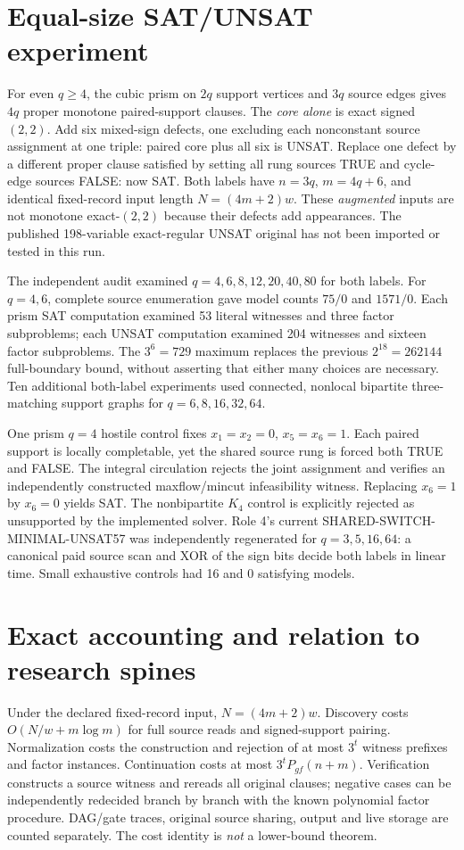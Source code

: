 \documentclass[10pt]{article}
\begin{document}
\section{Equal-size SAT/UNSAT experiment}
For even $q\ge4$, the cubic prism on $2q$ support vertices and $3q$ source edges gives $4q$ proper monotone paired-support clauses. The \emph{core alone} is exact signed $(2,2)$. Add six mixed-sign defects, one excluding each nonconstant source assignment at one triple: paired core plus all six is UNSAT. Replace one defect by a different proper clause satisfied by setting all rung sources TRUE and cycle-edge sources FALSE: now SAT. Both labels have $n=3q$, $m=4q+6$, and identical fixed-record input length $N=(4m+2)w$. These \emph{augmented} inputs are not monotone exact-$(2,2)$ because their defects add appearances. The published 198-variable exact-regular UNSAT original has not been imported or tested in this run.

The independent audit examined $q=4,6,8,12,20,40,80$ for both labels. For $q=4,6$, complete source enumeration gave model counts $75/0$ and $1571/0$. Each prism SAT computation examined 53 literal witnesses and three factor subproblems; each UNSAT computation examined 204 witnesses and sixteen factor subproblems. The $3^6=729$ maximum replaces the previous $2^{18}=262144$ full-boundary bound, without asserting that either many choices are necessary. Ten additional both-label experiments used connected, nonlocal bipartite three-matching support graphs for $q=6,8,16,32,64$.

One prism $q=4$ hostile control fixes $x_1=x_2=0$, $x_5=x_6=1$. Each paired support is locally completable, yet the shared source rung is forced both TRUE and FALSE. The integral circulation rejects the joint assignment and verifies an independently constructed maxflow/mincut infeasibility witness. Replacing $x_6=1$ by $x_6=0$ yields SAT. The nonbipartite $K_4$ control is explicitly rejected as unsupported by the implemented solver. Role 4's current SHARED-SWITCH-MINIMAL-UNSAT57 was independently regenerated for $q=3,5,16,64$: a canonical paid source scan and XOR of the sign bits decide both labels in linear time. Small exhaustive controls had 16 and 0 satisfying models.

\section{Exact accounting and relation to research spines}
Under the declared fixed-record input, $N=(4m+2)w$. Discovery costs $O(N/w+m\log m)$ for full source reads and signed-support pairing. Normalization costs the construction and rejection of at most $3^t$ witness prefixes and factor instances. Continuation costs at most $3^t P_{gf}(n+m)$. Verification constructs a source witness and rereads all original clauses; negative cases can be independently redecided branch by branch with the known polynomial factor procedure. DAG/gate traces, original source sharing, output and live storage are counted separately. The cost identity is \emph{not} a lower-bound theorem.
\end{document}
